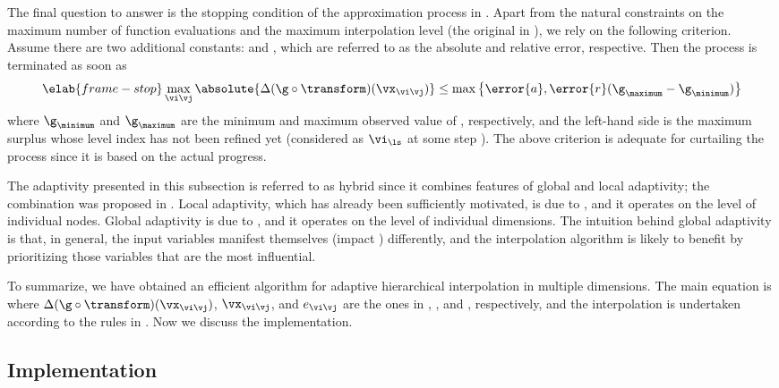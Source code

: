 The final question to answer is the stopping condition of the approximation
process in . Apart from the natural constraints on the
maximum number of function evaluations and the maximum interpolation level (the
original \ls in ), we rely on the following
criterion. Assume there are two additional constants:  and ,
which are referred to as the absolute and relative error, respective. Then the
process is terminated as soon as
\begin{equation} \elab{frame-stop}
  \max_{\vi \vj} \absolute{\Delta(\g \circ \transform)(\vx_{\vi \vj})} \leq \max \left\{ \error{a}, \error{r} (\g_\maximum - \g_\minimum) \right\}
\end{equation}
where $\g_\minimum$ and $\g_\maximum$ are the minimum and maximum observed value
of \g, respectively, and the left-hand side is the maximum surplus whose level
index has not been refined yet (considered as $\vi_{\ls}$ at some step \ls). The
above criterion is adequate for curtailing the process since it is based on the
actual progress.

The adaptivity presented in this subsection is referred to as hybrid since it
combines features of global and local adaptivity; the combination was proposed
in \cite{jakeman2012}. Local adaptivity, which has already been sufficiently
motivated, is due to \cite{ma2009}, and it operates on the level of individual
nodes. Global adaptivity is due to \cite{klimke2006}, and it operates on the
level of individual dimensions. The intuition behind global adaptivity is that,
in general, the input variables manifest themselves (impact \g) differently, and
the interpolation algorithm is likely to benefit by prioritizing those variables
that are the most influential.

\conclusioncut
To summarize, we have obtained an efficient algorithm for adaptive hierarchical
interpolation in multiple dimensions. The main equation is 
where $\Delta(\g \circ \transform)(\vx_{\vi \vj})$, $\vx_{\vi \vj}$, and $e_{\vi
\vj}$ are the ones in , , and
, respectively, and the interpolation is undertaken according
to the rules in . Now we discuss the implementation.

\subsection{Implementation}

